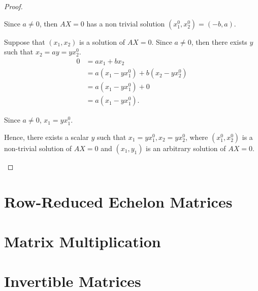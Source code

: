 \begin{proof}
\begin{enumerate}[label={(\alph*)}]
              Since $a\ne 0$, then $AX = 0$ has a non trivial solution $({x}^{0}_{1}, {x}^{0}_{2}) = (-b, a)$.

              Suppose that $(x_{1}, x_{2})$ is a solution of $AX = 0$. Since $a\ne 0$, then there exists $y$ such that $x_{2} = ay = y{x}^{0}_{2}$.
              \begin{align*}
                  0 & = a{x}_{1} + b{x}_{2}                                   \\
                    & = a({x}_{1} - y{x}^{0}_{1}) + b({x}_{2} - y{x}^{0}_{2}) \\
                    & = a({x}_{1} - y{x}^{0}_{1}) + 0                         \\
                    & = a({x}_{1} - y{x}^{0}_{1}).
              \end{align*}

              Since $a\ne 0$, ${x}_{1} = y{x}^{0}_{1}$.

              Hence, there exists a scalar $y$ such that $x_{1} = y{x}^{0}_{1}, x_{2} = y{x}^{0}_{2}$, where $({x}^{0}_{1}, {x}^{0}_{2})$ is a non-trivial solution of $AX = 0$ and $(x_{1}, y_{1})$ is an arbitrary solution of $AX = 0$.
    \end{enumerate}
\end{proof}

\section{Row-Reduced Echelon Matrices}

\section{Matrix Multiplication}

\section{Invertible Matrices}

